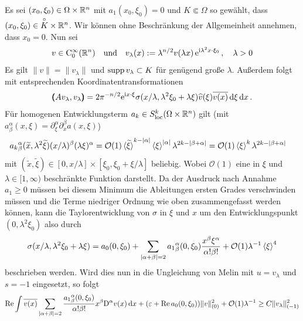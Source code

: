 Es sei $(x_0,\xi_0)\in\Omega\times\mathbb R^n$ mit $a_1(x_0,\xi_0)=0$ und $K\Subset \Omega$ so gewählt, dass  $(x_0,\xi_0)\in \overset{\circ} {K}\times\mathbb R^n$. Wir können ohne Beschränkung der Allgemeinheit annehmen, dass $x_0=0$. 
Nun sei 
\begin{align}
 v\in\mathrm C^\infty_0(\mathbb R^n) \quad \text{und} \quad v_\lambda(x):=\lambda^{n/2}v(\lambda x)\, \mathrm e^{\mathrm i\lambda^2x\cdot \xi_0}\, ,\quad\lambda>0
\end{align}
Es gilt $\|v\|=\|v_\lambda\|$ und $\operatorname{supp} v_\lambda \subset K$ für genügend große $\lambda$. Außerdem folgt mit entsprechenden Koordinatentransformationen
\begin{align}
\pmb(A v_\lambda,v_\lambda\pmb) = {2\pi}^{-n/2}\relax \mathrm e^{\mathrm i x\cdot \xi} \sigma(x/\lambda,\lambda^2\xi_0 + \lambda\xi)\widehat v(\xi)\overline{v(x)}\,\mathrm d\xi\,\mathrm d x\,.
\end{align}
Für homogenen Entwicklungsterm $a_k\in S^k_\mathrm{loc}(\Omega\times\mathbb R^n)$ gilt (mit $a^\alpha_\beta(x,\xi) = \partial_\xi^\alpha \partial_x^\beta a(x,\xi)$)
\begin{align}
&{a_k}^\alpha_\beta(\widetilde x, \lambda^2 \widetilde \xi)(x/\lambda)^\beta(\lambda\xi)^\alpha = \mathcal O(1)\braket{\widetilde\xi}^{k-\lvert\alpha\rvert}\braket{\xi}^{\lvert\alpha\rvert}\lambda^{2k-\lvert\beta+\alpha\rvert} = \mathcal O(1)\braket{\xi}^{k}\lambda^{2k-\lvert\beta+\alpha\rvert}
\end{align}
mit $(\widetilde x,\widetilde\xi)\in[0,x/\lambda]\times[\xi_0,\xi_0 + \xi/\lambda]$ beliebig. Wobei $\mathcal O(1)$ eine in $\xi$ und $\lambda\in[1,\infty)$ beschränkte Funktion darstellt. Da der Ausdruck nach Annahme $a_1\ge 0$ müssen bei diesem Minimum die Ableitungen ersten Grades verschwinden müssen und die Terme niedriger Ordnung wie oben zusammengefasst werden können, kann die Taylorentwicklung von $\sigma$ in $\xi$ und $x$ um den Entwicklungspunkt $(0,\lambda^2\xi_0)$ also durch
\begin{align}
\sigma(x/\lambda, \lambda^2\xi_0+\lambda\xi) = a_0(0,\xi_0) + \sum_{\lvert\alpha+\beta\rvert=2} {a_1}^\alpha_\beta(0,\xi_0)\frac{x^\beta\xi^\alpha}{\alpha!\beta!} + \mathcal O(1) \lambda^{-1}\braket{\xi}^4
\end{align}
beschrieben werden. Wird dies nun in die Ungleichung von Melin mit $u=v_\lambda$ und $s=-1$ eingesetzt, so folgt
\begin{align}
\operatorname{Re}\int \overline{v(x)}\sum_{\lvert\alpha+\beta\rvert=2}\frac{{a_1}^\alpha_\beta(0,\xi_0)}{\alpha!\beta!}x^\beta\mathrm D^\alpha v(x)\,\mathrm d x + (\varepsilon +\operatorname{Re} a_0(0,\xi_0))\|v\|_{(0)}^2 + \mathcal O(1)\lambda^{-1}\ge C\|v_\lambda\|_{(-1)}^2
\end{align}
